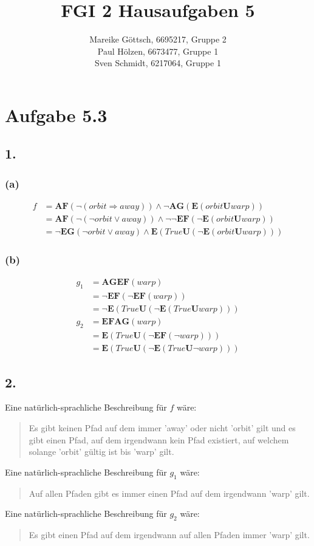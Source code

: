 \documentclass[12pt, paper=a4]{article}
\author{Mareike Göttsch, 6695217, Gruppe 2\\Paul Hölzen, 6673477, Gruppe 1\\Sven Schmidt, 6217064, Gruppe 1}
\title{FGI 2 Hausaufgaben 5}
\begin{document}
\maketitle

\section*{Aufgabe 5.3}
\subsection*{1.}
\subsubsection*{(a)}
\begin{align*}
f &= \mathbf{AF}(\neg( orbit \Rightarrow away)) \land \neg\mathbf{AG}( \mathbf{E}( orbit\mathbf{U}warp)) \\ &=  \mathbf{AF}(\neg(\neg orbit\lor away))\land\neg\neg \mathbf{EF}(\neg \mathbf{E}(orbit\mathbf{U}warp)) \\ &= \neg \mathbf{EG}(\neg orbit\lor away)\land \mathbf{E}(True\mathbf{U}(\neg \mathbf{E}(orbit\mathbf{U}warp)))
\end{align*}
\subsubsection*{(b)}
\begin{align*}
g_{1} &= \mathbf{AGEF}(warp) \\ &= \neg \mathbf{EF}(\neg\mathbf{EF}(warp)) \\ &= \neg\mathbf{E}(True\mathbf{U}(\neg\mathbf{E}(True\mathbf{U}warp)))
\end{align*}
\begin{align*}
g_{2} &= \mathbf{EFAG}(warp) \\ &=\mathbf{E}(True\mathbf{U}(\neg \mathbf{EF}(\neg warp))) \\
&= \mathbf{E}(True\mathbf{U}(\neg \mathbf{E}(True\mathbf{U}\neg warp)))
\end{align*}

\subsection*{2.}
Eine natürlich-sprachliche Beschreibung für $f$ wäre:
\begin{quote}
	Es gibt keinen Pfad auf dem immer 'away' oder nicht 'orbit' gilt und es gibt einen Pfad, auf dem irgendwann kein Pfad existiert, auf welchem solange 'orbit' gültig ist bis 'warp' gilt.
\end{quote}
Eine natürlich-sprachliche Beschreibung für $g_{1}$ wäre:
\begin{quote}
	Auf allen Pfaden gibt es immer einen Pfad auf dem irgendwann 'warp' gilt.
\end{quote}
Eine natürlich-sprachliche Beschreibung für $g_{2}$ wäre:
\begin{quote}
	Es gibt einen Pfad auf dem irgendwann auf allen Pfaden immer 'warp' gilt.
\end{quote}
\end{document}
